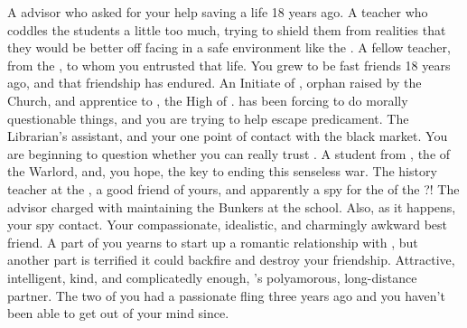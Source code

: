\documentclass[char]{GL2020}
\begin{document}
\begin{contacts}
    \contact{\cEvil{}} A \pFarm{} advisor who asked for your help saving a life 18 years ago.
    \contact{\cMusic{}} A \pFarm{} teacher who coddles the students a little too much, trying to shield them from realities that they would be better off facing in a safe environment like the \pSc{}.
    \contact{\cPirate{}} A fellow teacher, from the \pShip{}, to whom you entrusted that life. You grew to be fast friends 18 years ago, and that friendship has endured.
    \contact{\cScholarship{}} An Initiate of \cTechGod{}, orphan raised by the Church, and apprentice to \cAntiChup{}, the High \cAntiChup{\Cleric} of \cTechGod{}. \cAntiChup{} has been forcing \cScholarship{\them} to do morally questionable things, and you are trying to help \cScholarship{\them} escape \cScholarship{\their} predicament.
    \contact{\cLibAssist{}} The Librarian's assistant, and your one point of contact with the black market. You are beginning to question whether you can really trust \cLibAssist{\them}.
    \contact{\cWarlordDaughter{}} A student from \pShip{}, the \cWarlordDaughter{\offspring} of the Warlord, and, you hope, the key to ending this senseless war.
    \contact{\cHistory{}} The history teacher at the \pSc{}, a good friend of yours, and apparently a spy for the \cQueen{\Monarch} of the \pFarm{}?!
    \contact{\cBunker{}} The advisor charged with maintaining the Bunkers at the school. Also, as it happens, your \pShip{} spy contact.
    \contact{\cBeetle{}} Your compassionate, idealistic, and charmingly awkward best friend. A part of you yearns to start up a romantic relationship with \cBeetle{\them}, but another part is terrified it could backfire and destroy your friendship.
    \contact{\cJuniorStatesman{}} Attractive, intelligent, kind, and complicatedly enough, \cBeetle{}'s polyamorous, long-distance partner. The two of you had a passionate fling three years ago and you haven’t been able to get \cJuniorStatesman{\them} out of your mind since.
\end{contacts}
\end{document}
